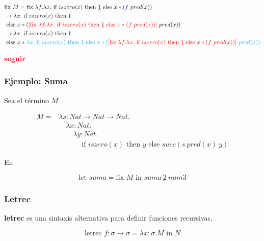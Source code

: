 \documentclass{report}
\theoremstyle{definition} %
\newcommand{\todo}[1]{{\textcolor{red}{\textbf{#1}}}}
\newcommand{\tfunc}[2]{#1 \to #2}
\newcommand{\ifte}[3]{\ \text{if } #1 \text{ then } #2 \text{ else } #3}
\newcommand{\abs}[3]{\lambda #1 : #2 . #3}
\newcommand{\app}[2]{#1 \ #2} %
\newcommand{\uabs}[2]{\lambda #1 . #2} %
\newcommand{\suc}[1]{succ(#1)}
\newcommand{\pred}[1]{pred(#1)}
\newcommand{\iszero}[1]{iszero(#1)}
\newcommand{\num}[1]{\underbar{#1}} %
\newcommand{\uletin}[3]{\text{let } #1 = #2 \text{ in } #3} %
\newcommand{\fix}[1]{\text{fix } #1}
\newcommand{\letrec}[4]{\text{letrec } #1 : #2 = #3 \text{ in } #4}
\newcommand{\reduces}{\to}
\newcommand{\changed}[1]{\textcolor{red}{#1}}
\newcommand{\select}[1]{\textcolor{blue}{#1}}
\begin{document}
\begin{align*}
    &\fix{M} = \fix{\uabs{f}{\uabs{x}{
        \ifte{\iszero{x}}{\num{1}}{x * (\app{\select{f}}{pred(x)})}
    }}}\\
    &\reduces \uabs{x}{\ifte{iszero(x)}{1\\ &}
        { x *
            (\app
                {
                    \changed{[\fix{\uabs{f}{\uabs{x}{
                        \ifte{\iszero{x}}{\num{1}}{x * (\app{f}{pred(x)})}
                    }}}]}
                }{pred(x)})
        }
    }\\
    &\reduces \uabs{x}{
        \ifte
            {iszero(x)}
            {1\\ &}
            { x * 
              \textcolor{cyan}
              {
                \uabs{x}{\ifte{iszero(x)}{1}
                { x *
                    (\app
                        {
                            \changed{[\fix{\uabs{f}{\uabs{x}{
                                \ifte{\iszero{x}}{\num{1}}{x * (\app{f}{pred(x)})}
                            }}}]}
                        }{pred(x)})
                }}
              }
            }
    }
\end{align*}

\todo{seguir}

\subsubsection{Ejemplo: Suma}

Sea el término $M$

\begin{align*}
    M = &\abs{s}{\tfunc{Nat}{\tfunc{Nat}{Nat}}}
        {\\ &\quad \abs{x}{Nat}
            {\\ &\qquad \abs{y}{Nat}
                {\\ &\quad\qquad \ifte{\iszero{x}}{y}{\suc{s\ \pred{x}\ y}}}}}
\end{align*}

En

\[
    \uletin{suma}{\fix{M}}{suma\ \num{2}\ num{3}}
\]

\subsubsection{Letrec}

\textbf{letrec} es una sintaxis alternativa para definir funciones recursivas,

\[
    \letrec{f}{\tfunc{\sigma}{\sigma}}{\abs{x}{\sigma}{M}}{N}
\]
\end{document}
